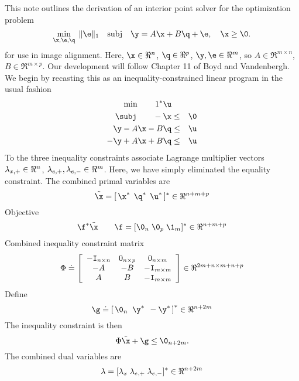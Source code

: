 This note outlines the derivation of an interior point solver for the optimization problem
\begin{equation}
\min_{\x,\e,\q}\;  \| \e \|_1 \quad \mathrm{subj} \quad \y = A \x + B \q + \e, \quad \x \ge \0.
\end{equation}
for use in image alignment. Here, $\x \in \Re^n$, $\q \in \Re^p$, $\y, \e \in \Re^m$, so $A \in \Re^{m \times n}$, $B \in \Re^{m\times p}$. Our development will follow Chapter 11 of Boyd and Vandenbergh. We begin by recasting this as an inequality-constrained linear program in the usual fashion
\begin{eqnarray*}
\min \qquad 1^* \u \\
\subj \qquad -\x &\le& \0 \\
\y - A\x - B\q &\le& \u \\
-\y + A \x + B\q &\le& \u
\end{eqnarray*}
To the three inequality constraints associate Lagrange multiplier vectors $\mathbf{\lambda}_{x,+} \in \Re^n$, $\mathbf{\lambda}_{e,+}, \mathbf{\lambda}_{e,-} \in \Re^m$. Here, we have simply eliminated the equality constraint. The combined primal variables are 
\begin{equation}
\tilde \x = [ \, \x^* \;\, \q^* \;\, \u^* \, ]^* \in \Re^{n+m+p}
\end{equation}
Objective
\begin{equation}
\f^* \tilde \x \qquad   \f = [ \0_n \; \0_p \; \1_m ]^* \in \Re^{n+m+p}
\end{equation}
Combined inequality constraint matrix 
\begin{equation}
\Phi \doteq \left[ \begin{array}{ccc} 
-\mathtt{I}_{n \times n} & 0_{n \times p} & 0_{n \times m} \\
-A &  -B & - \mathtt{I}_{m \times m} \\
A  &   B  &  - \mathtt{I}_{m \times m} \\
\end{array} \right] \in \Re^{2m + n \times m + n + p}
\end{equation}
Define 
\begin{equation}
\g \doteq \left[ \, \0_n \;\; \y^* \;\, -\y^* \, \right]^* \in \Re^{n + 2m}
\end{equation}
The inequality constraint is then $$\Phi \tilde \x + \g \le \0_{n+2m}.$$
The combined dual variables are 
\begin{equation}
\mathbf{\lambda} = [ \mathbf{\lambda}_{x} \; \mathbf{\lambda}_{e,+} \; \mathbf{\lambda}_{e,-} ]^* \in \Re^{n+2m}
\end{equation}
